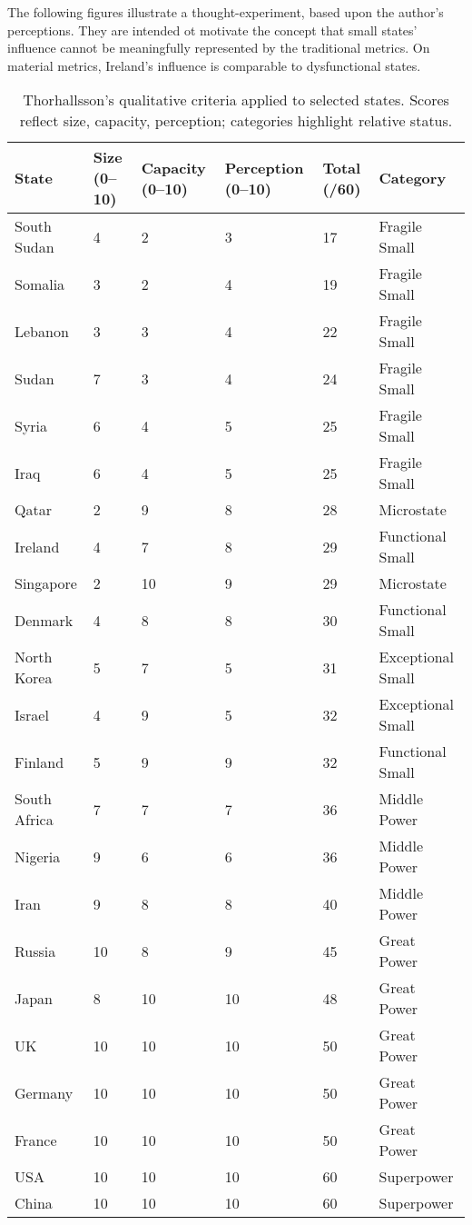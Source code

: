 The following figures illustrate a thought-experiment, based upon the author's perceptions. They are intended ot motivate the concept that small states' influence cannot be meaningfully represented by the traditional metrics. On material metrics, Ireland's influence is comparable to dysfunctional states. 
\begin{table}[ht]
	\centering
	\begin{tabular}{p{2.8cm} p{1.5cm} p{1.8cm} p{2cm} p{1.8cm} p{2cm}}
		\hline
		\textbf{State} & \textbf{Size (0–10)} & \textbf{Capacity (0–10)} & \textbf{Perception (0–10)} & \textbf{Total (/60)} & \textbf{Category} \\
		\hline
		South Sudan & 4 & 2 & 3 & 17 & Fragile Small \\
		Somalia & 3 & 2 & 4 & 19 & Fragile Small \\
		Lebanon & 3 & 3 & 4 & 22 & Fragile Small \\
		Sudan & 7 & 3 & 4 & 24 & Fragile Small \\
		Syria & 6 & 4 & 5 & 25 & Fragile Small \\
		Iraq & 6 & 4 & 5 & 25 & Fragile Small \\
		Qatar & 2 & 9 & 8 & 28 & Microstate \\
		Ireland & 4 & 7 & 8 & 29 & Functional Small \\
		Singapore & 2 & 10 & 9 & 29 & Microstate \\
		Denmark & 4 & 8 & 8 & 30 & Functional Small \\
		North Korea & 5 & 7 & 5 & 31 & Exceptional Small \\
		Israel & 4 & 9 & 5 & 32 & Exceptional Small \\
		Finland & 5 & 9 & 9 & 32 & Functional Small \\
		South Africa & 7 & 7 & 7 & 36 & Middle Power \\
		Nigeria & 9 & 6 & 6 & 36 & Middle Power \\
		Iran & 9 & 8 & 8 & 40 & Middle Power \\
		Russia & 10 & 8 & 9 & 45 & Great Power \\
		Japan & 8 & 10 & 10 & 48 & Great Power \\
		UK & 10 & 10 & 10 & 50 & Great Power \\
		Germany & 10 & 10 & 10 & 50 & Great Power \\
		France & 10 & 10 & 10 & 50 & Great Power \\
		USA & 10 & 10 & 10 & 60 & Superpower \\
		China & 10 & 10 & 10 & 60 & Superpower \\
		\hline
	\end{tabular}
	\caption{Thorhallsson’s qualitative criteria applied to selected states. Scores reflect size, capacity, perception; categories highlight relative status.}
\end{table}

